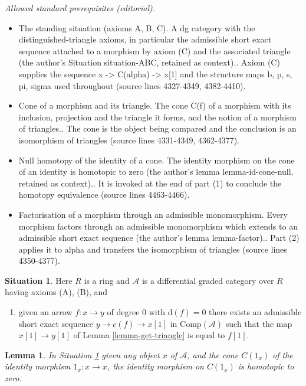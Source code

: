 \documentclass{stacks-project}
\theoremstyle{plain}
\newtheorem{lemma}[subsection]{Lemma}
\theoremstyle{definition}
\newtheorem{situation}[subsection]{Situation}
\theoremstyle{remark}
\numberwithin{equation}{subsection}
\begin{document}
\noindent\textit{Allowed standard prerequisites (editorial).}\begin{itemize}
\item The standing situation (axioms A, B, C). A dg category with the distinguished-triangle axioms, in particular the admissible short exact sequence attached to a morphism by axiom (C) and the associated triangle (the author's Situation situation-ABC, retained as context).. Axiom (C) supplies the sequence x -> C(alpha) -> x[1] and the structure maps b, p, s, pi, sigma used throughout (source lines 4327-4349, 4382-4410).
\item Cone of a morphism and its triangle. The cone C(f) of a morphism with its inclusion, projection and the triangle it forms, and the notion of a morphism of triangles.. The cone is the object being compared and the conclusion is an isomorphism of triangles (source lines 4331-4349, 4362-4377).
\item Null homotopy of the identity of a cone. The identity morphism on the cone of an identity is homotopic to zero (the author's lemma lemma-id-cone-null, retained as context).. It is invoked at the end of part (1) to conclude the homotopy equivalence (source lines 4463-4466).
\item Factorisation of a morphism through an admissible monomorphism. Every morphism factors through an admissible monomorphism which extends to an admissible short exact sequence (the author's lemma lemma-factor).. Part (2) applies it to alpha and transfers the isomorphism of triangles (source lines 4350-4377).
\end{itemize}\medskip
\begin{situation}
\label{situation-ABC}
Here $R$ is a ring and $\mathcal{A}$ is a differential graded category
over $R$ having axioms (A), (B), and
\begin{enumerate}
\item[(C)] given an arrow $f : x \to y$ of degree $0$ with
$\text{d}(f) = 0$ there exists an admissible short exact sequence
$y \to c(f) \to x[1]$ in $\text{Comp}(\mathcal{A})$ such that the map
$x[1] \to y[1]$ of Lemma \ref{lemma-get-triangle} is equal to $f[1]$.
\end{enumerate}
\end{situation}

\begin{lemma}
\label{lemma-id-cone-null}
In Situation \ref{situation-ABC}
given any object $x$ of $\mathcal{A}$, and the cone $C(1_x)$ of the
identity morphism $1_x : x \to x$, the identity morphism on
$C(1_x)$ is homotopic to zero.
\end{lemma}
\end{document}
